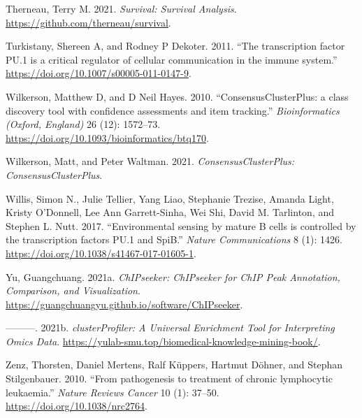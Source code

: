 \documentclass[11pt, a4paper, twosided]{book}
\newenvironment{CSLReferences}%
  {}%
  {\par}
\begin{document}
\begin{CSLReferences}{1}{0}
\leavevmode{}%
Therneau, Terry M. 2021. \emph{Survival: Survival Analysis}. \url{https://github.com/therneau/survival}.

\leavevmode{}%
Turkistany, Shereen A, and Rodney P Dekoter. 2011. {``{The transcription factor PU.1 is a critical regulator of cellular communication in the immune system}.''} \url{https://doi.org/10.1007/s00005-011-0147-9}.

\leavevmode{}%
Wilkerson, Matthew D, and D Neil Hayes. 2010. {``{ConsensusClusterPlus: a class discovery tool with confidence assessments and item tracking.}''} \emph{Bioinformatics (Oxford, England)} 26 (12): 1572--73. \url{https://doi.org/10.1093/bioinformatics/btq170}.

\leavevmode{}%
Wilkerson, Matt, and Peter Waltman. 2021. \emph{ConsensusClusterPlus: ConsensusClusterPlus}.

\leavevmode{}%
Willis, Simon N., Julie Tellier, Yang Liao, Stephanie Trezise, Amanda Light, Kristy O'Donnell, Lee Ann Garrett-Sinha, Wei Shi, David M. Tarlinton, and Stephen L. Nutt. 2017. {``{Environmental sensing by mature B cells is controlled by the transcription factors PU.1 and SpiB}.''} \emph{Nature Communications} 8 (1): 1426. \url{https://doi.org/10.1038/s41467-017-01605-1}.

\leavevmode{}%
Yu, Guangchuang. 2021a. \emph{ChIPseeker: ChIPseeker for ChIP Peak Annotation, Comparison, and Visualization}. \url{https://guangchuangyu.github.io/software/ChIPseeker}.

\leavevmode{}%
---------. 2021b. \emph{clusterProfiler: A Universal Enrichment Tool for Interpreting Omics Data}. \url{https://yulab-smu.top/biomedical-knowledge-mining-book/}.

\leavevmode{}%
Zenz, Thorsten, Daniel Mertens, Ralf Küppers, Hartmut Döhner, and Stephan Stilgenbauer. 2010. {``{From pathogenesis to treatment of chronic lymphocytic leukaemia}.''} \emph{Nature Reviews Cancer} 10 (1): 37--50. \url{https://doi.org/10.1038/nrc2764}.

\end{CSLReferences}
\indent
\setlength{\parindent}{17pt}
\setlength{\leftskip}{0pt}
\setlength{\parskip}{0pt}
\end{document}
